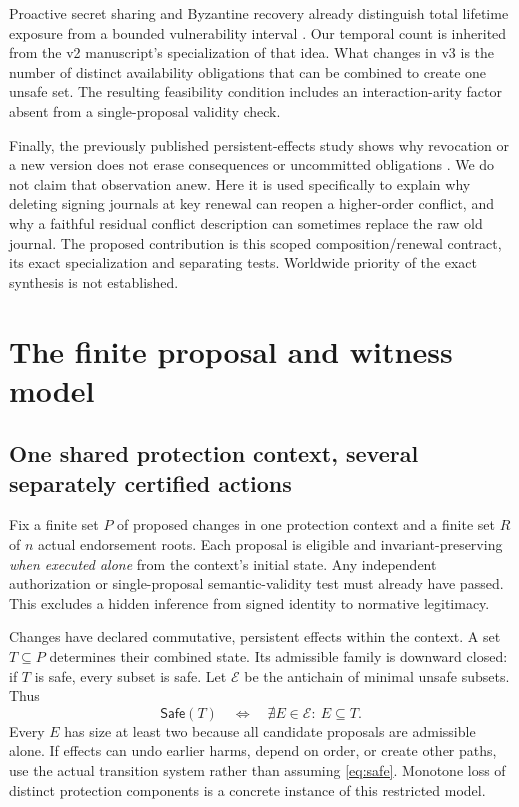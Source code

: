 \documentclass[11pt,a4paper]{article}
\theoremstyle{definition}\newtheorem{definition}{Definition}
\newcommand{\E}{\mathcal E}\newcommand{\B}{\mathcal B}\newcommand{\F}{\mathcal F}\newcommand{\Q}{\mathcal Q}
\begin{document}
Proactive secret sharing and Byzantine recovery already distinguish total lifetime exposure from a bounded vulnerability interval \cite{hjky,castro}. Our temporal count is inherited from the v2 manuscript's specialization of that idea. What changes in v3 is the number of distinct availability obligations that can be combined to create one unsafe set. The resulting feasibility condition includes an interaction-arity factor absent from a single-proposal validity check.

Finally, the previously published persistent-effects study shows why revocation or a new version does not erase consequences or uncommitted obligations \cite{rac13}. We do not claim that observation anew. Here it is used specifically to explain why deleting signing journals at key renewal can reopen a higher-order conflict, and why a faithful residual conflict description can sometimes replace the raw old journal. The proposed contribution is this scoped composition/renewal contract, its exact specialization and separating tests. Worldwide priority of the exact synthesis is not established.

\section{The finite proposal and witness model}
\label{sec:model}
\subsection{One shared protection context, several separately certified actions}
Fix a finite set $P$ of proposed changes in one protection context and a finite set $R$ of $n$ actual endorsement roots. Each proposal is eligible and invariant-preserving \emph{when executed alone} from the context's initial state. Any independent authorization or single-proposal semantic-validity test must already have passed. This excludes a hidden inference from signed identity to normative legitimacy.

Changes have declared commutative, persistent effects within the context. A set $T\subseteq P$ determines their combined state. Its admissible family is downward closed: if $T$ is safe, every subset is safe. Let $\E$ be the antichain of minimal unsafe subsets. Thus
\begin{equation}
\mathsf{Safe}(T)\quad\Longleftrightarrow\quad\nexists E\in\E:\ E\subseteq T.
\label{eq:safe}
\end{equation}
Every $E$ has size at least two because all candidate proposals are admissible alone. If effects can undo earlier harms, depend on order, or create other paths, use the actual transition system rather than assuming \cref{eq:safe}. Monotone loss of distinct protection components is a concrete instance of this restricted model.
\end{document}
